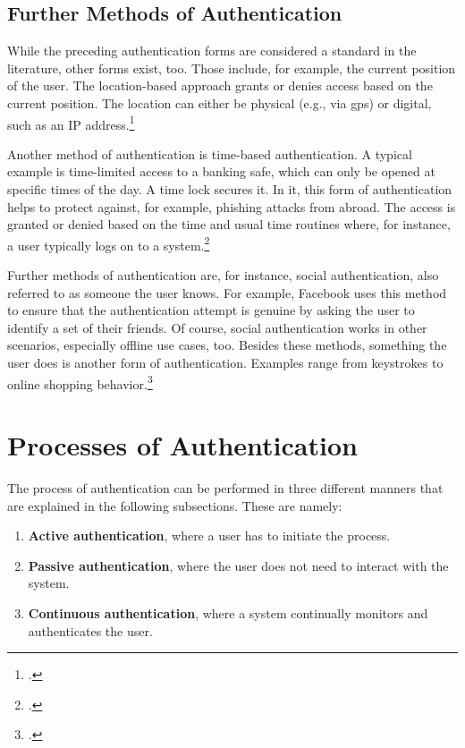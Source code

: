 \subsection{Further Methods of Authentication}

While the preceding authentication forms are considered a standard in the literature, other forms exist, too. Those include, for example, the current position of the user. The location-based approach grants or denies access based on the current position. The location can either be physical (e.g., via \gls{gps}) or digital, such as an IP address.\footcites[See][]{6296127}[See][Chapter 13.9]{2308830}

Another method of authentication is time-based authentication. A typical example is time-limited access to a banking safe, which can only be opened at specific times of the day. A time lock secures it. In \gls{it}, this form of authentication helps to protect against, for example, phishing attacks from abroad. The access is granted or denied based on the time and usual time routines where, for instance, a user typically logs on to a system.\footcite[See][191]{dasgupta2017multi}

Further methods of authentication are, for instance, social authentication, also referred to as \frqq someone the user knows\flqq. For example, Facebook uses this method to ensure that the authentication attempt is genuine by asking the user to identify a set of their friends. Of course, social authentication works in other scenarios, especially offline use cases, too. Besides these methods, \frqq something the user does\flqq{} is another form of authentication. Examples range from keystrokes to online shopping behavior.\footcites[See][]{Brainard2006}[See][278--279]{shostack2014threat}[See][]{10.1007/978-3-642-18178-8_9}[See][]{7460349}

\section{Processes of Authentication}

The process of authentication can be performed in three different manners that are explained in the following subsections. These are namely:

\begin{enumerate}
	\item \textbf{Active authentication}, where a user has to initiate the process.
	\item \textbf{Passive authentication}, where the user does not need to interact with the system.
	\item \textbf{Continuous authentication}, where a system continually monitors and authenticates the user.
\end{enumerate}


